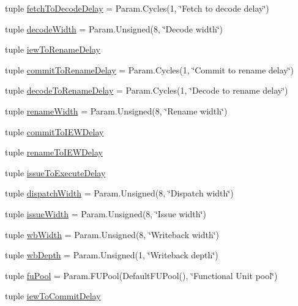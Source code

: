 \begin{DoxyCompactItemize}
\item 
tuple \hyperlink{classO3CPU_1_1DerivO3CPU_a10e1e587508ee15562df112d1142b851}{fetchToDecodeDelay} = Param.Cycles(1, \char`\"{}Fetch to decode delay\char`\"{})
\item 
tuple \hyperlink{classO3CPU_1_1DerivO3CPU_a52dc575e0588181eb7c3bd1e3d803cfd}{decodeWidth} = Param.Unsigned(8, \char`\"{}Decode width\char`\"{})
\item 
tuple \hyperlink{classO3CPU_1_1DerivO3CPU_a54dd22869ae708c0b6bffab65d4d03c5}{iewToRenameDelay}
\item 
tuple \hyperlink{classO3CPU_1_1DerivO3CPU_a35c9cdaf793827c316dee784cbf39d96}{commitToRenameDelay} = Param.Cycles(1, \char`\"{}Commit to rename delay\char`\"{})
\item 
tuple \hyperlink{classO3CPU_1_1DerivO3CPU_a168896b51e7cc580a9f343e0538ed193}{decodeToRenameDelay} = Param.Cycles(1, \char`\"{}Decode to rename delay\char`\"{})
\item 
tuple \hyperlink{classO3CPU_1_1DerivO3CPU_a6500ae95e23f48433d63280c42925a31}{renameWidth} = Param.Unsigned(8, \char`\"{}Rename width\char`\"{})
\item 
tuple \hyperlink{classO3CPU_1_1DerivO3CPU_afc77f4f67ebd047a4af56403975f4464}{commitToIEWDelay}
\item 
tuple \hyperlink{classO3CPU_1_1DerivO3CPU_acdec10386abd09a4724775d533fc65d4}{renameToIEWDelay}
\item 
tuple \hyperlink{classO3CPU_1_1DerivO3CPU_ab445ea6366a58d7753b058bd794548a8}{issueToExecuteDelay}
\item 
tuple \hyperlink{classO3CPU_1_1DerivO3CPU_ac7d8d81c4bbae7e104c3802f303ad90a}{dispatchWidth} = Param.Unsigned(8, \char`\"{}Dispatch width\char`\"{})
\item 
tuple \hyperlink{classO3CPU_1_1DerivO3CPU_a1e02adcb8a1e64fc82f4b389844d2f68}{issueWidth} = Param.Unsigned(8, \char`\"{}Issue width\char`\"{})
\item 
tuple \hyperlink{classO3CPU_1_1DerivO3CPU_a35ee0eb859fedb522c629bc7d435b5e4}{wbWidth} = Param.Unsigned(8, \char`\"{}Writeback width\char`\"{})
\item 
tuple \hyperlink{classO3CPU_1_1DerivO3CPU_ac88ce0b2118b9b2687a490fd150a228b}{wbDepth} = Param.Unsigned(1, \char`\"{}Writeback depth\char`\"{})
\item 
tuple \hyperlink{classO3CPU_1_1DerivO3CPU_a2e5415d0645b0ec485165d188df68775}{fuPool} = Param.FUPool(DefaultFUPool(), \char`\"{}Functional Unit pool\char`\"{})
\item 
tuple \hyperlink{classO3CPU_1_1DerivO3CPU_a724a185702137da4a74c263b1ea63fec}{iewToCommitDelay}

\end{DoxyCompactItemize}
